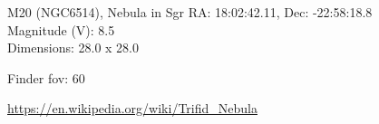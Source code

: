 \begin{block}{M20 (NGC6514), Nebula in Sgr}
    RA: 18:02:42.11, Dec: -22:58:18.8 \\ 
    Magnitude (V): 8.5 \\ 
    Dimensions: 28.0 x 28.0 

    Finder fov: 60 

    \url{https://en.wikipedia.org/wiki/Trifid_Nebula} 
\end{block}